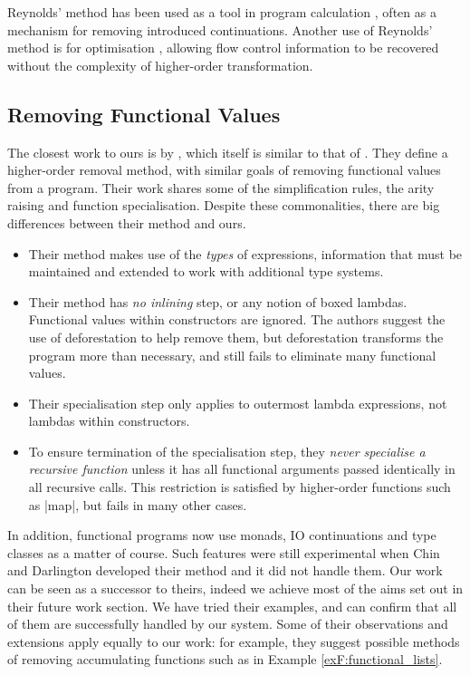 Reynolds' method has been used as a tool in program calculation \cite{danvy:defunctionalization_at_work,hutton:calculating_an_exceptional_machine}, often as a mechanism for removing introduced continuations. Another use of Reynolds' method is for optimisation \cite{jhc}, allowing flow control information to be recovered without the complexity of higher-order transformation.

\subsection{Removing Functional Values}

The closest work to ours is by \citet{chin:higher_order_removal}, which itself is similar to that of \citet{nelan:firstification}. They define a higher-order removal method, with similar goals of removing functional values from a program. Their work shares some of the simplification rules, the arity raising and function specialisation. Despite these commonalities, there are big differences between their method and ours.

\begin{itemize}
\item Their method makes use of the \textit{types} of expressions, information that must be maintained and extended to work with additional type systems.
\item Their method has \textit{no inlining} step, or any notion of boxed lambdas. Functional values within constructors are ignored. The authors suggest the use of deforestation \cite{wadler:deforestation} to help remove them, but deforestation transforms the program more than necessary, and still fails to eliminate many functional values.
\item Their specialisation step only applies to outermost lambda expressions, not lambdas within constructors.
\item To ensure termination of the specialisation step, they \textit{never specialise a recursive function} unless it has all functional arguments passed identically in all recursive calls. This restriction is satisfied by higher-order functions such as |map|, but fails in many other cases.
\end{itemize}

In addition, functional programs now use monads, IO continuations and type classes as a matter of course. Such features were still experimental when Chin and Darlington developed their method and it did not handle them. Our work can be seen as a successor to theirs, indeed we achieve most of the aims set out in their future work section. We have tried their examples, and can confirm that all of them are successfully handled by our system. Some of their observations and extensions apply equally to our work: for example, they suggest possible methods of removing accumulating functions such as in Example \ref{exF:functional_lists}.

